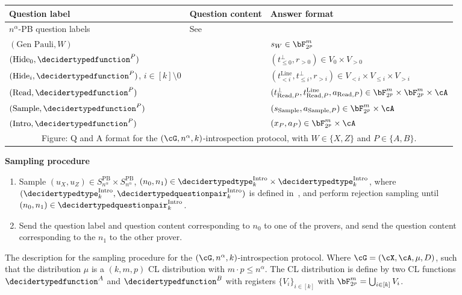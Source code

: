 \begin{figure}[t!]
	\centering
	\footnotesize
	\begin{gamespec}
		\setlength{\tabcolsep}{1em}
		\begin{tabularx}{\textwidth}{ l   l   X   }
			\toprule
			Question label & Question content & Answer format \\
			\midrule
			$n^{\alpha}$-PB question labels&  \multicolumn{2}{l}{See~\Cref{fig:PauliBasis}} \\
			$(\text{Gen Pauli}, W)$&  & $s_{W}  \in  \bF_{2^p}^m$\\
			$(\text{Hide}_0, \decidertypedfunction^{P})$&  & $(t_{\leq 0}^{\bot}, r_{> 0})  \in  V_{0} \times V_{> 0}$\\
			$(\text{Hide}_i, \decidertypedfunction^{P})$, $i \in [k] \setminus 0$&  & $(t_{< i}^{\text{Line}},t_{\leq i}^{\bot}, r_{> i})  \in  V_{< i} \times V_{\leq i} \times V_{> i}$\\
			$(\text{Read},  \decidertypedfunction^{P})$&  & $(t_{\text{Read}, P}^{\bot},t_{\text{Read}, P}^{\text{Line}}, a_{\text{Read}, P})  \in \bF_{2^p}^m \times \bF_{2^p}^m \times \cA$\\
			$(\text{Sample},  \decidertypedfunction^{P})$&  & $(s_{\text{Sample}}, a_{\text{Sample}, P})  \in \bF_{2^p}^m \times \cA$\\
			$(\text{Intro},  \decidertypedfunction^{P})$&  & $(x_P, a_P)  \in \bF_{2^p}^m \times \cA$\\
			\bottomrule
			\multicolumn{3}{c}{Figure: Q and A format for the $(\cG,n^\alpha, k)$-introspection protocol, with $W \in \{X,Z\}$ and $P \in\{A,B\}$. }
		\end{tabularx}
		
		\begin{center}
			\textbf{Sampling procedure}
		\end{center}
		\begin{enumerate}
			\item Sample $(u_X,u_Z) \in S^{\text{PB}}_{n^{\alpha}}\times S^{\text{PB}}_{n^{\alpha}}$,  $(n_0, n_1) \in \decidertypedtype^{\text{Intro}}_k \times \decidertypedtype^{\text{Intro}}_k$,  where $(\decidertypedtype^{\text{Intro}}_k, \decidertypedquestionpair^{\text{Intro}}_k)$ is defined in~, and perform rejection sampling until $(n_0, n_1) \in \decidertypedquestionpair^{\text{Intro}}_k$. 
			\item Send the question label and question content corresponding to $n_0$ to one of the provers, and send the question content corresponding to the $n_1$ to the other prover.
		\end{enumerate}
	\end{gamespec}
		\caption{\footnotesize The description for the sampling procedure for the $(\cG,n^\alpha, k)$-introspection protocol. Where $\cG = (\cX, \cA, \mu, D)$, such that the distribution $\mu$ is a $(k,m,p)$ CL distribution with $m \cdot p \leq n^{\alpha}$. The CL distribution is define by two CL functions $\decidertypedfunction^A$ and $\decidertypedfunction^{B}$ with registers $\{V_i\}_{i \in [k]}$ with $\bF_{2^p}^m = \bigcup_{i \in [k]}V_i$. }
	\label{fig:Introspectionsample}
\end{figure}


